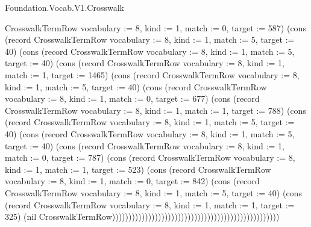 \begin{lexlean}{Foundation.Vocab.V1.Crosswalk}
\begin{semanticmodule}
{CrosswalkTermRow {vocabulary := 8, kind := 1, match := 0, target := 587}) (cons (record CrosswalkTermRow {vocabulary := 8, kind := 1, match := 5, target := 40}) (cons (record CrosswalkTermRow {vocabulary := 8, kind := 1, match := 5, target := 40}) (cons (record CrosswalkTermRow {vocabulary := 8, kind := 1, match := 1, target := 1465}) (cons (record CrosswalkTermRow {vocabulary := 8, kind := 1, match := 5, target := 40}) (cons (record CrosswalkTermRow {vocabulary := 8, kind := 1, match := 0, target := 677}) (cons (record CrosswalkTermRow {vocabulary := 8, kind := 1, match := 1, target := 788}) (cons (record CrosswalkTermRow {vocabulary := 8, kind := 1, match := 5, target := 40}) (cons (record CrosswalkTermRow {vocabulary := 8, kind := 1, match := 5, target := 40}) (cons (record CrosswalkTermRow {vocabulary := 8, kind := 1, match := 0, target := 787}) (cons (record CrosswalkTermRow {vocabulary := 8, kind := 1, match := 1, target := 523}) (cons (record CrosswalkTermRow {vocabulary := 8, kind := 1, match := 0, target := 842}) (cons (record CrosswalkTermRow {vocabulary := 8, kind := 1, match := 5, target := 40}) (cons (record CrosswalkTermRow {vocabulary := 8, kind := 1, match := 1, target := 325}) (nil CrosswalkTermRow)))))))))))))))))))))))))))))))))))))))))))))))))))
}


\end{semanticmodule}
\end{lexlean}
